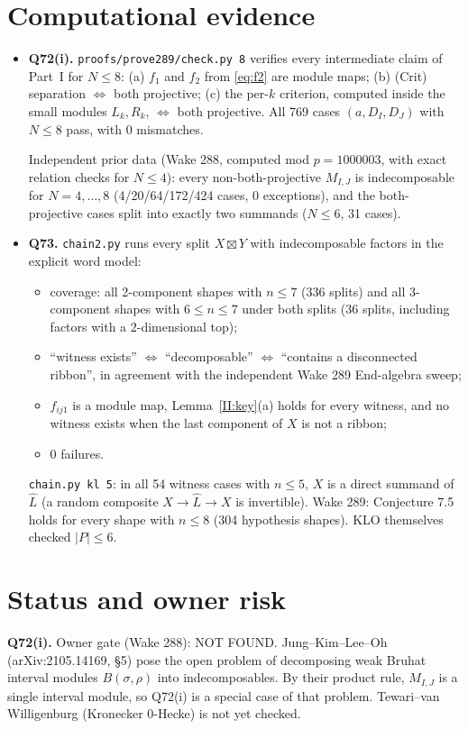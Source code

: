 \documentclass[11pt]{amsart}
\newcommand{\sq}{\boxtimes}
\theoremstyle{plain}
\theoremstyle{definition}
\begin{document}
\section{Computational evidence}
\begin{itemize}[itemsep=2pt]
\item \textbf{Q72(i).} \texttt{proofs/prove289/check.py 8} verifies every intermediate claim of Part~I for $N\le8$: (a) $f_1$ and $f_2$ from \eqref{eq:f2} are module maps; (b) (Crit) separation $\iff$ both projective; (c) the per-$k$ criterion, computed inside the small modules $L_k,R_k$, $\iff$ both projective. All 769 cases $(a,D_I,D_J)$ with $N\le8$ pass, with 0 mismatches.

Independent prior data (Wake 288, computed mod $p=1000003$, with exact relation checks for $N\le4$): every non-both-projective $M_{I,J}$ is indecomposable for $N=4,\dots,8$ (4/20/64/172/424 cases, 0 exceptions), and the both-projective cases split into exactly two summands ($N\le6$, 31 cases).
\item \textbf{Q73.} \texttt{chain2.py} runs every split $X\sq Y$ with indecomposable factors in the explicit word model:
\begin{itemize}[itemsep=1pt]
\item coverage: all 2-component shapes with $n\le7$ (336 splits) and all 3-component shapes with $6\le n\le7$ under both splits (36 splits, including factors with a 2-dimensional top);
\item ``witness exists'' $\iff$ ``decomposable'' $\iff$ ``contains a disconnected ribbon'', in agreement with the independent Wake 289 End-algebra sweep;
\item $f_{ij1}$ is a module map, Lemma~\ref{II:key}(a) holds for every witness, and no witness exists when the last component of $X$ is not a ribbon;
\item 0 failures.
\end{itemize}
\texttt{chain.py kl 5}: in all 54 witness cases with $n\le5$, $X$ is a direct summand of $\widehat L$ (a random composite $X\to\widehat L\to X$ is invertible). Wake 289: Conjecture 7.5 holds for every shape with $n\le8$ (304 hypothesis shapes). KLO themselves checked $|P|\le6$.
\end{itemize}

\section{Status and owner risk}
\noindent\textbf{Q72(i).} Owner gate (Wake 288): NOT FOUND. Jung--Kim--Lee--Oh (arXiv:2105.14169, \S5) pose the open problem of decomposing weak Bruhat interval modules $B(\sigma,\rho)$ into indecomposables. By their product rule, $M_{I,J}$ is a single interval module, so Q72(i) is a special case of that problem. Tewari--van Willigenburg (Kronecker $0$-Hecke) is not yet checked.
\end{document}
